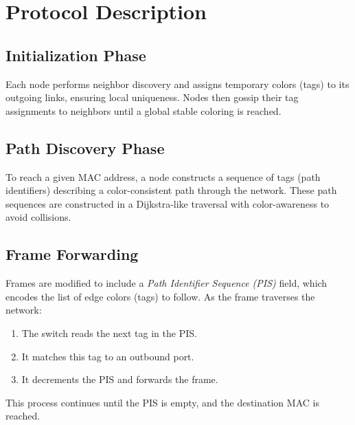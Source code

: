 \documentclass[../../../OAE-SPEC-MAIN.tex]{subfiles}
\begin{document}
\section{Protocol Description}

\subsection{Initialization Phase}

Each node performs neighbor discovery and assigns temporary colors (tags) to its outgoing links, ensuring local uniqueness. Nodes then gossip their tag assignments to neighbors until a global stable coloring is reached.

\subsection{Path Discovery Phase}

To reach a given MAC address, a node constructs a sequence of tags (path identifiers) describing a color-consistent path through the network. These path sequences are constructed in a Dijkstra-like traversal with color-awareness to avoid collisions.

\subsection{Frame Forwarding}

Frames are modified to include a \emph{Path Identifier Sequence (PIS)} field, which encodes the list of edge colors (tags) to follow. As the frame traverses the network:

\begin{enumerate}
    \item The switch reads the next tag in the PIS.
    \item It matches this tag to an outbound port.
    \item It decrements the PIS and forwards the frame.
\end{enumerate}

This process continues until the PIS is empty, and the destination MAC is reached.
\end{document}
